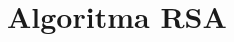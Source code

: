 \documentclass[../buku_kriptografi.tex]{subfiles}
\begin{document}
\ifdefined\InMainDocument\else\setcounter{chapter}{7}\fi

\chapter{Algoritma RSA}






\ifdefined\InMainDocument\else


\fi
\end{document}
